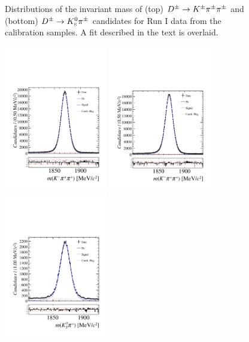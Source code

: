 \begin{figure}[h]
\caption{Distributions of the invariant mass of (top) ${{D}^\pm}\rightarrow{\ensuremath{{K}^\pm}}{\ensuremath{{\pi}^\pm}}{\ensuremath{{\pi}^\pm}}$ and (bottom) ${{D}^\pm}\rightarrow{\ensuremath{{K}^0_{\mathrm{ \scriptscriptstyle S}}}}{\ensuremath{{\pi}^\pm}}$ candidates for Run I data from the calibration samples. A fit described in the text is overlaid.}
\label{fig:KpiAsymFitsRun1}
\end{figure}


\begin{figure}[h]
\includegraphics[height=!,width=0.4\textwidth]{figs/KpiAsym/fit_negative_kpipi_15up.pdf}
\includegraphics[height=!,width=0.4\textwidth]{figs/KpiAsym/fit_positive_kpipi_15up.pdf}\\
\includegraphics[height=!,width=0.4\textwidth]{figs/KpiAsym/fit_negative_kspi_15up.pdf}

\end{figure}
